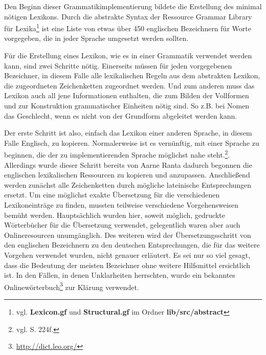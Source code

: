 Den Beginn dieser Grammatikimplementierung bildete die Erstellung des minimal nötigen Lexikons. Durch die abstrakte Syntax der Ressource Grammar Library für Lexika\footnote{vgl. \textbf{Lexicon.gf} und \textbf{Structural.gf} im Ordner \textbf{lib/src/abstract}} ist eine Liste von etwas über 450 englischen Bezeichnern für Worte vorgegeben, die in jeder Sprache umgesetzt werden sollten. \par
Für die Erstellung eines Lexikon, wie es in einer Grammatik verwendet werden kann, sind zwei Schritte nötig. Einerseits müssen für jeden vorgegebenen Bezeichner, in diesem Falle alle lexikalischen Regeln aus dem abstrakten Lexikon, die zugeordneten Zeichenketten zugeordnet werden. Und zum anderen muss das Lexikon auch all jene Informationen enthalten, die zum Bilden der Vollformen und zur Konstruktion grammatischer Einheiten nötig sind. So z.B. bei Nomen das Geschlecht, wenn es nicht von der Grundform abgeleitet werden kann. \par
Der erste Schritt ist also, einfach das Lexikon einer anderen Sprache, in diesem Falle Englisch, zu kopieren. Normalerweise ist es vernünftig, mit einer Sprache zu beginnen, die der zu implementierenden Sprache möglichst nahe steht.\footnote{vgl. \cite{RANTA2011} S. 224f.}. Allerdings wurde dieser Schritt bereits von Aarne Ranta dadurch begonnen die englischen lexikalischen Ressourcen zu kopieren und anzupassen. Anschließend werden zunächst alle Zeichenketten durch mögliche lateinische Entsprechungen ersetzt. Um eine möglichst exakte Übersetzung für die verschiedenen Lexikoneinträge zu finden, mussten teilweise verschiedene Vorgehensweisen bemüht werden. Hauptsächlich wurden hier, soweit möglich, gedruckte Wörterbücher für die Übersetzung verwendet, gelegentlich waren aber auch Onlineresourcen unumgänglich. Des weiteren wird der Übersetzungsschritt von den englischen Bezeichnern zu den deutschen Entsprechungen, die für das weitere Vorgehen verwendet wurden, nicht genauer erläutert. Es sei nur so viel gesagt, dass die Bedeutung der meisten Bezeichner ohne weitere Hilfsmittel ersichtlich ist. In den Fällen, in denen Unklarheiten herrschten, wurde ein bekanntes Onlinewörterbuch\footnote{\url{http://dict.leo.org/}} zur Klärung verwendet.\par
